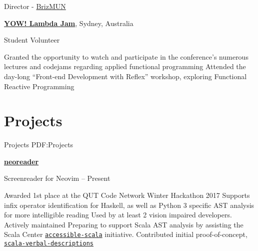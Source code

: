 \documentclass[a4paper,10pt,oneside]{article}
\begin{document}
\begin{body}
\par Director - \href{http://www.brizmun.com/}{BrizMUN} \hfill {}

\EntryGap

\href{http://lambdajam.yowconference.com.au/}
{\textbf{YOW! Lambda Jam}}, Sydney, Australia  

\par Student Volunteer\hfill {} 

\begin{detail}
\BulletItem Granted the opportunity to watch and participate in the conference's numerous lectures and codejams regarding applied functional programming
\BulletItem Attended the day-long ``Front-end Development with Reflex'' workshop, exploring Functional Reactive Programming
\end{detail}




\section
{Projects}
{Projects}
{PDF:Projects}

\href{https://github.com/MaxwellBo/neoreader}{\textbf{neoreader}} 
\par Screenreader for Neovim\hfill {} -- Present
\begin{detail}
	\BulletItem Awarded 1st place at the QUT Code Network Winter Hackathon 2017
	\BulletItem Supports infix operator identification for Haskell, as well as Python 3 specific AST analysis for more intelligible reading
	\BulletItem  Used by at least 2 vision impaired developers. Actively maintained
	\BulletItem Preparing to support Scala AST analysis by assisting the Scala Center \href{https://github.com/scalacenter/accessible-scala}{\texttt{accessible-scala}} initiative. Contributed initial proof-of-concept, \href{https://github.com/MaxwellBo/scala-verbal-descriptions}{\texttt{scala-verbal-descriptions}}
\end{detail}


\end{body}
\end{document}
